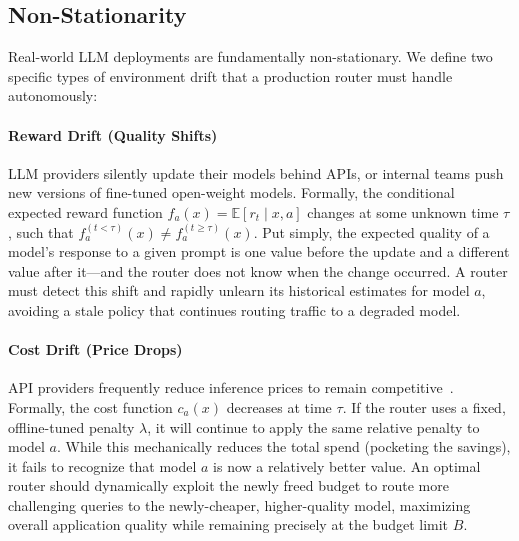 \subsection{Non-Stationarity}

Real-world LLM deployments are fundamentally non-stationary. We define two specific types of environment drift that a production router must handle autonomously:

\paragraph{Reward Drift (Quality Shifts)}
LLM providers silently update their models behind APIs, or internal teams push new versions of fine-tuned open-weight models. Formally, the conditional expected reward function $f_a(x) = \mathbb{E}[r_t \mid x, a]$ changes at some unknown time $\tau$, such that $f_a^{(t < \tau)}(x) \neq f_a^{(t \geq \tau)}(x)$.  Put simply, the expected quality of a model's response to a given prompt is one value before the update and a different value after it---and the router does not know when the change occurred.  A router must detect this shift and rapidly unlearn its historical estimates for model $a$, avoiding a stale policy that continues routing traffic to a degraded model.

\paragraph{Cost Drift (Price Drops)}
API providers frequently reduce inference prices to remain competitive~\cite{thompson2026timeline}. Formally, the cost function $c_a(x)$ decreases at time $\tau$. If the router uses a fixed, offline-tuned penalty $\lambda$, it will continue to apply the same relative penalty to model $a$. While this mechanically reduces the total spend (pocketing the savings), it fails to recognize that model $a$ is now a relatively better value. An optimal router should dynamically exploit the newly freed budget to route more challenging queries to the newly-cheaper, higher-quality model, maximizing overall application quality while remaining precisely at the budget limit $B$.